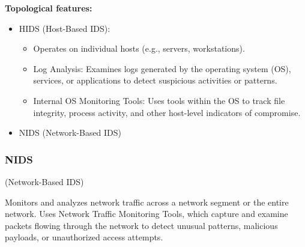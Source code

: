 \textbf{Topological features:}
\begin{itemize}
    \item HIDS (Host-Based IDS): 
    \begin{itemize}
        \item Operates on individual hosts (e.g., servers, workstations).
        \item Log Analysis: Examines logs generated by the operating system (OS), services, or applications to detect suspicious activities or patterns.
        \item Internal OS Monitoring Tools: Uses tools within the OS to track file integrity, process activity, and other host-level indicators of compromise.
    \end{itemize}
    \item NIDS (Network-Based IDS)
\end{itemize}

\subsubsection{NIDS}
\begin{center}
    (Network-Based IDS)
\end{center}
Monitors and analyzes network traffic across a network segment or the entire network. Uses Network Traffic Monitoring Tools, which capture and examine packets flowing through the network to detect unusual patterns, malicious payloads, or unauthorized access attempts.

